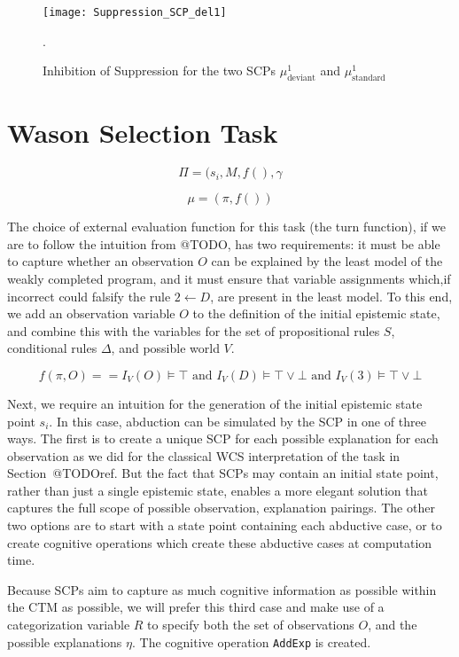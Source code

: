 \begin{figure}
\centering \texttt{[image: Suppression\_SCP\_del1]}
\caption{Inhibition of Suppression for the two SCPs $\mu^1_\text{deviant}$ and $\mu^1_\text{standard}$}.
\label{fig:Suppression_SCP_del1}
\end{figure}


\section{Wason Selection Task}\label{sec:wstSCP}

\[\Pi=(s_i,M,f(),\gamma\]



\[\mu=(\pi,f())\]

The choice of external evaluation function for this task (the turn function), if we are to follow the intuition from @TODO, has two requirements: it must be able to capture whether an observation $O$ can be explained by the least model of the weakly completed program, and it must ensure that variable assignments which,if incorrect could falsify the rule $2\leftarrow D$, are present in the least model. To this end, we add an observation variable $O$ to the definition of the initial epistemic state, and combine this with the variables for the set of propositional rules $S$, conditional rules $\Delta$, and possible world $V$.



\[f(\pi,O)==  I_V(O)\models \top \textrm{ and } I_V(D)\models \top \lor \bot \textrm{ and } I_V(3)\models \top \lor \bot\]



Next, we require an intuition for the generation of the initial epistemic state point $s_i$. In this case, abduction can be simulated by the SCP in one of three ways. The first is to create a unique SCP for each possible explanation for each observation as we did for the classical WCS interpretation of the task in Section~@TODOref. But the fact that SCPs may contain an initial state point, rather than just a single epistemic state, enables a more elegant solution that captures the full scope of possible observation, explanation pairings. The other two options are to start with a state point containing each abductive case, or to create cognitive operations which create these abductive cases at computation time.

Because SCPs aim to capture as much cognitive information as possible within the CTM as possible, we will prefer this third case and make use of a categorization variable $R$ to specify both the set of observations $O$, and the possible explanations $\eta$. The cognitive operation \texttt{AddExp} is created.

